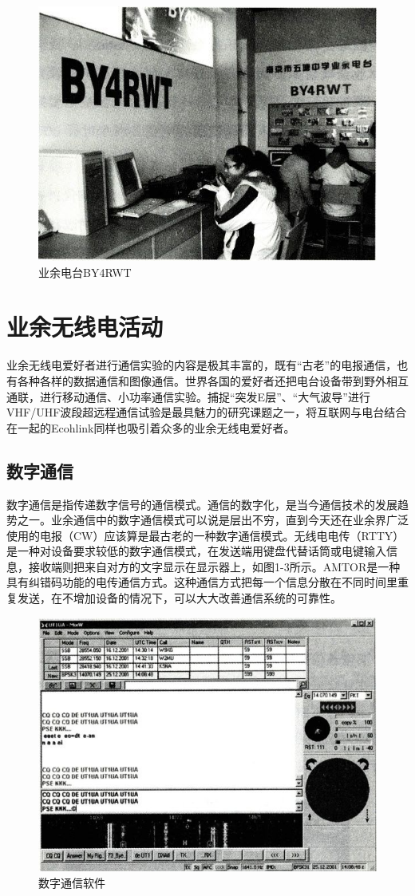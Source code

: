 \documentclass[12pt,UTF8]{ctexbook}
\begin{document}
\begin{figure}[htbp]
	\centering
	\includegraphics[width=0.7\linewidth]{2}
	\caption{业余电台BY4RWT}
	\label{fig:1}
\end{figure}

\section{业余无线电活动}

业余无线电爱好者进行通信实验的内容是极其丰富的，既有“古老”的电报通信，也有各种各样的数据通信和图像通信。世界各国的爱好者还把电台设备带到野外相互通联，进行移动通信、小功率通信实验。捕捉“突发E层”、“大气波导”进行VHF/UHF波段超远程通信试验是最具魅力的研究课题之一，将互联网与电台结合在一起的Ecohlink同样也吸引着众多的业余无线电爱好者。

\subsection{数字通信}
数字通信是指传递数字信号的通信模式。通信的数字化，是当今通信技术的发展趋势之一。业余通信中的数字通信模式可以说是层出不穷，直到今天还在业余界广泛使用的电报（CW）应该算是最古老的一种数字通信模式。无线电电传（RTTY）是一种对设备要求较低的数字通信模式，在发送端用键盘代替话筒或电键输入信息，接收端则把来自对方的文字显示在显示器上，如图1-3所示。AMTOR是一种具有纠错码功能的电传通信方式。这种通信方式把每一个信息分散在不同时间里重复发送，在不增加设备的情况下，可以大大改善通信系统的可靠性。

\begin{figure}[htbp]
	\centering
	\includegraphics[width=0.7\linewidth]{3}
	\caption{数字通信软件}
	\label{fig:1}
\end{figure}
\end{document}
